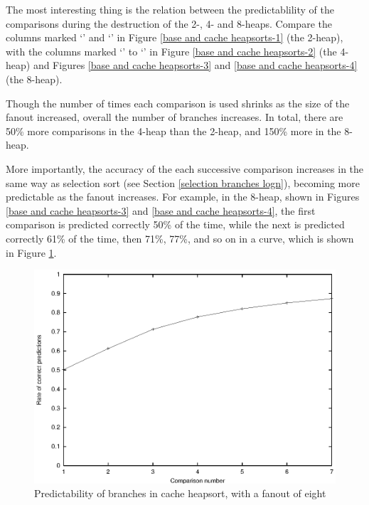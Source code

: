 The most interesting thing is the relation between the predictablility of the
comparisons during the destruction of the 2-, 4- and 8-heaps. Compare the
columns marked `' and `' in Figure \ref{base and cache heapsorts-1} (the 2-heap), with the
columns marked `' to `' in Figure \ref{base and
cache heapsorts-2} (the 4-heap) and Figures \ref{base and cache heapsorts-3} and
\ref{base and cache heapsorts-4} (the 8-heap).

Though the number of times each comparison is used shrinks
as the size of the fanout increased, overall the number of branches increases.
In total, there are 50\% more comparisons in the 4-heap than the 2-heap, and
150\% more in the 8-heap.

More importantly, the accuracy of the each
successive comparison increases in the same way as selection sort (see Section
\ref{selection branches logn}), becoming more predictable as the fanout
increases. For example, in the 8-heap, shown in Figures \ref{base and cache heapsorts-3}
and \ref{base and cache heapsorts-4},
the first comparison is predicted correctly 50\% of the
time, while the next is predicted correctly 61\% of the time, then 71\%, 77\%, and
so on in a curve, which is shown in Figure \ref{cache heapsort curve}.

\begin{figure}
\includegraphics{../counters/curve.eps}
\caption{Predictability of branches in cache heapsort, with a fanout of eight}
\label{cache heapsort curve}
\end{figure}

